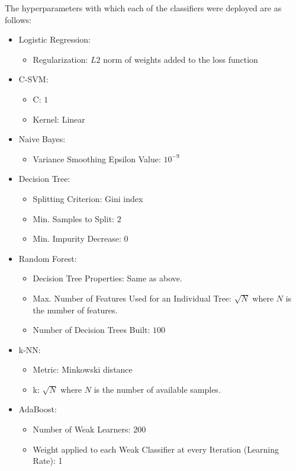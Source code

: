 \documentclass[journal,onecolumn]{IEEEtran}
\begin{document}
The hyperparameters with which each of the classifiers were deployed are as follows:
\begin{itemize}
  \item Logistic Regression: \begin{itemize}
    \item Regularization: $L2$ norm of weights added to the loss function
  \end{itemize}
  \item C-SVM: \begin{itemize}
    \item C: $1$
    \item Kernel: Linear
  \end{itemize}
  \item Naive Bayes: \begin{itemize}
    \item Variance Smoothing Epsilon Value: $10^{-9}$
  \end{itemize}
  \item Decision Tree: \begin{itemize}
    \item Splitting Criterion: Gini index
    \item Min. Samples to Split: $2$
    \item Min. Impurity Decrease: $0$
  \end{itemize}
  \item Random Forest: \begin{itemize}
    \item Decision Tree Properties: Same as above.
    \item Max. Number of Features Used for an Individual Tree: $\sqrt{N}$ where $N$ is the number of features.
    \item Number of Decision Trees Built: $100$
  \end{itemize}
  \item k-NN: \begin{itemize}
    \item Metric: Minkowski distance
    \item k: $\sqrt{N}$ where $N$ is the number of available samples.
  \end{itemize}
  \item AdaBoost: \begin{itemize}
    \item Number of Weak Learners: $200$
    \item Weight applied to each Weak Classifier at every Iteration (Learning Rate): 1
  \end{itemize}

\end{itemize}
\end{document}
